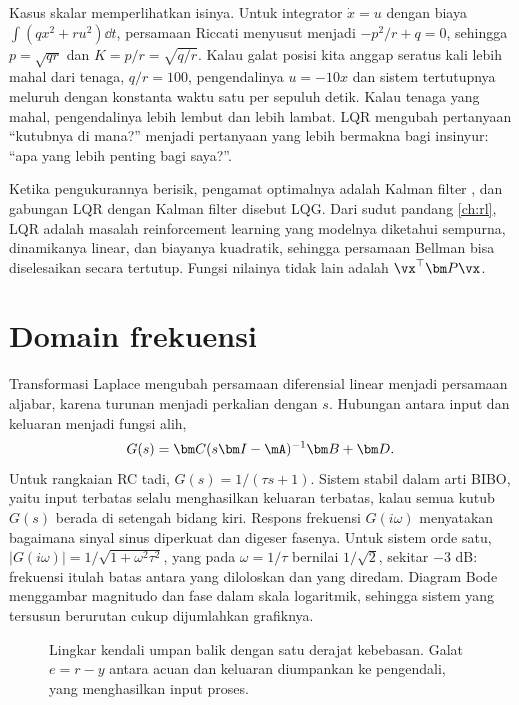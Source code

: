 Kasus skalar memperlihatkan isinya. Untuk integrator $\dot x=u$ dengan biaya $\int(qx^2+ru^2)\dd t$, persamaan
Riccati menyusut menjadi $-p^2/r+q=0$, sehingga $p=\sqrt{qr}$ dan $K=p/r=\sqrt{q/r}$. Kalau galat posisi kita
anggap seratus kali lebih mahal dari tenaga, $q/r=100$, pengendalinya $u=-10x$ dan sistem tertutupnya meluruh
dengan konstanta waktu satu per sepuluh detik. Kalau tenaga yang mahal, pengendalinya lebih lembut dan lebih
lambat. LQR mengubah pertanyaan ``kutubnya di mana?'' menjadi pertanyaan yang lebih bermakna bagi insinyur:
``apa yang lebih penting bagi saya?''.

Ketika pengukurannya berisik, pengamat optimalnya adalah Kalman filter \citep{kalman1960}, dan gabungan LQR dengan
Kalman filter disebut LQG. Dari sudut pandang \cref{ch:rl}, LQR adalah masalah reinforcement learning yang modelnya
diketahui sempurna, dinamikanya linear, dan biayanya kuadratik, sehingga persamaan Bellman bisa diselesaikan secara
tertutup. Fungsi nilainya tidak lain adalah $\vx^\top\bm P\vx$.

\section{Domain frekuensi}

Transformasi Laplace mengubah persamaan diferensial linear menjadi persamaan aljabar, karena turunan menjadi
perkalian dengan $s$. Hubungan antara input dan keluaran menjadi fungsi alih,
\begin{equation}
G(s)=\bm C(s\bm I-\mA)^{-1}\bm B+\bm D.
\end{equation}
Untuk rangkaian RC tadi, $G(s)=1/(\tau s+1)$. Sistem stabil dalam arti BIBO, yaitu input terbatas selalu
menghasilkan keluaran terbatas, kalau semua kutub $G(s)$ berada di setengah bidang kiri. Respons frekuensi
$G(i\omega)$ menyatakan bagaimana sinyal sinus diperkuat dan digeser fasenya. Untuk sistem orde satu,
$|G(i\omega)|=1/\sqrt{1+\omega^2\tau^2}$, yang pada $\omega=1/\tau$ bernilai $1/\sqrt2$, sekitar $-3$ dB:
frekuensi itulah batas antara yang diloloskan dan yang diredam. Diagram Bode menggambar magnitudo dan fase
dalam skala logaritmik, sehingga sistem yang tersusun berurutan cukup dijumlahkan grafiknya.

\begin{figure}[ht]
\centering
{}
\caption{Lingkar kendali umpan balik dengan satu derajat kebebasan. Galat $e=r-y$ antara acuan dan keluaran
diumpankan ke pengendali, yang menghasilkan input proses.}
\label{fig:lingkar}
\end{figure}

